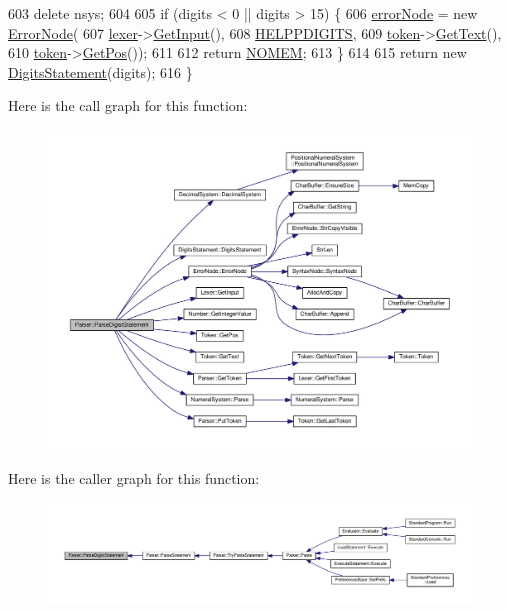 \begin{DoxyCode}
603     \textcolor{keyword}{delete} nsys;
604 
605     \textcolor{keywordflow}{if} (digits < 0 || digits > 15) \{
606         \hyperlink{classParser_ab482ff79113ad2f1ef60bc6dd18528d1}{errorNode} = \textcolor{keyword}{new} \hyperlink{classErrorNode}{ErrorNode}(
607             \hyperlink{classParser_a8a8214126b0b0455e3ce375f3e9b20bf}{lexer}->\hyperlink{classLexer_a3032cbeb851294bccd61b722d9a86265}{GetInput}(),
608             \hyperlink{text_8h_a06483f1d13dc5bbd6a855b5c716248a9}{HELPPDIGITS},
609             \hyperlink{classParser_a467028559d31c5b33f16ca8be56715cc}{token}->\hyperlink{structToken_a15f1043de07ce8e452fbf115b85def71}{GetText}(),
610             \hyperlink{classParser_a467028559d31c5b33f16ca8be56715cc}{token}->\hyperlink{structToken_a5f93ea94940a6eeb060507e1da594599}{GetPos}());
611 
612         \textcolor{keywordflow}{return} \hyperlink{platform_8h_a46ff2bfbf0d44b8466a2251d5bd5e6f8}{NOMEM};
613     \}
614 
615     \textcolor{keywordflow}{return} \textcolor{keyword}{new} \hyperlink{classDigitsStatement}{DigitsStatement}(digits);
616 \}
\end{DoxyCode}


Here is the call graph for this function\+:
\nopagebreak
\begin{figure}[H]
\begin{center}
\leavevmode
\includegraphics[width=350pt]{d0/d40/classParser_a14aa2850063f998f76530e027c3ef399_cgraph}
\end{center}
\end{figure}




Here is the caller graph for this function\+:
\nopagebreak
\begin{figure}[H]
\begin{center}
\leavevmode
\includegraphics[width=350pt]{d0/d40/classParser_a14aa2850063f998f76530e027c3ef399_icgraph}
\end{center}
\end{figure}


